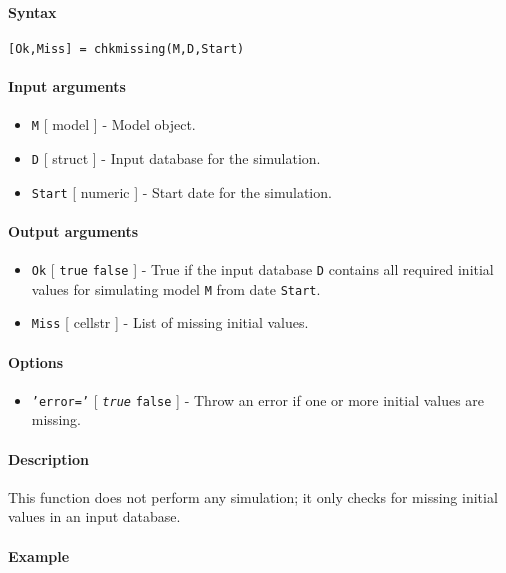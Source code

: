 


	\paragraph{Syntax}

\begin{verbatim}
[Ok,Miss] = chkmissing(M,D,Start)
\end{verbatim}

\paragraph{Input arguments}

\begin{itemize}
\item
  \texttt{M} {[} model {]} - Model object.
\item
  \texttt{D} {[} struct {]} - Input database for the simulation.
\item
  \texttt{Start} {[} numeric {]} - Start date for the simulation.
\end{itemize}

\paragraph{Output arguments}

\begin{itemize}
\item
  \texttt{Ok} {[} \texttt{true} \textbar{} \texttt{false} {]} - True if
  the input database \texttt{D} contains all required initial values for
  simulating model \texttt{M} from date \texttt{Start}.
\item
  \texttt{Miss} {[} cellstr {]} - List of missing initial values.
\end{itemize}

\paragraph{Options}

\begin{itemize}
\itemsep1pt\parskip0pt
\item
  \texttt{'error='} {[} \emph{\texttt{true}} \textbar{} \texttt{false}
  {]} - Throw an error if one or more initial values are missing.
\end{itemize}

\paragraph{Description}

This function does not perform any simulation; it only checks for
missing initial values in an input database.

\paragraph{Example}


